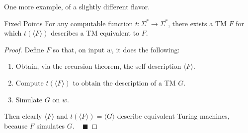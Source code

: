 One more example, of a slightly different flavor.

\begin{theorem}{Fixed Points}
    For any computable function $t \colon \Sigma^* \to \Sigma^*$,
    there exists a TM $F$ for which
    $t(\langle F \rangle)$ describes a TM equivalent to $F$.
\end{theorem}

\begin{proof}
    Define $F$ so that, on input $w$, it does the following:
    \begin{enumerate}
        \item Obtain, via the recursion theorem,
        the self-description $\langle F \rangle$.
        \item Compute $t(\langle F \rangle)$
        to obtain the description of a TM $G$.
        \item Simulate $G$ on $w$.
    \end{enumerate}
    Then clearly $\langle F \rangle$ and
    $t(\langle F \rangle) = \langle G \rangle$
    describe equivalent Turing machines,
    because $F$ simulates $G$. ~ $\blacksquare$
\end{proof}

